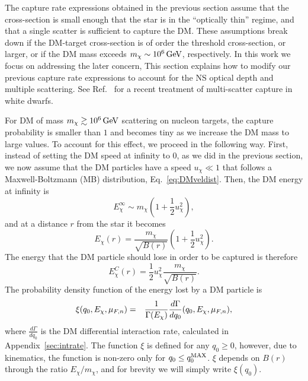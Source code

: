 The capture rate expressions obtained in the previous section assume that the cross-section is small enough that the star is in the ``optically thin'' regime, and that a single scatter is sufficient to capture the DM. These assumptions break down if the DM-target cross-section is of order the threshold cross-section, or larger, or if the DM mass exceeds $m_\chi \sim 10^6{\rm \,GeV}$, respectively. 
In this work we focus on addressing the later concern, 
This section explains how to modify our previous capture rate expressions to account for the NS optical depth and multiple scattering.  See Ref.~\cite{Dasgupta:2019juq_Darkmattercapture} for a recent treatment of multi-scatter capture in white dwarfs.


For DM of mass $m_\chi\gtrsim 10^6{\rm \,GeV}$ scattering on nucleon targets, the capture probability is smaller than $1$ and becomes tiny as we increase the DM mass to large values. To account for this effect, we proceed in the following way. First, instead of setting the DM speed at infinity to $0$, as we did in the previous section, we now assume that the DM particles have a speed $u_\chi\ll 1$ that follows a Maxwell-Boltzmann (MB) distribution, Eq.~\ref{eq:DMveldist}. 
Then, the DM energy at infinity is 
\begin{equation}
    E^\infty_\chi \sim m_\chi \left(1+\frac{1}{2}u_\chi^2\right), 
\end{equation}
and at a distance $r$ from the star it becomes
\begin{equation}
    E_\chi(r) = \frac{m_\chi}{\sqrt{B(r)}} \left(1+\frac{1}{2}u_\chi^2\right).
    \label{eq:Echir}
\end{equation}
The energy that the DM particle should lose in order to be captured is therefore
\begin{equation}
    E_\chi^C(r) =  \frac{1}{2}u_\chi^2 \frac{m_\chi}{\sqrt{B(r)}}. 
\end{equation} 
The probability density function of the energy lost by a DM particle is 
\begin{eqnarray}
\xi(q_0,E_\chi,\mu_{F,n}) &=& \frac{1}{\Gamma(E_\chi)}\frac{d\Gamma}{dq_0}(q_0,E_\chi,\mu_{F,n}),\label{eq:normintrate}
\end{eqnarray}
where $\frac{d\Gamma}{dq_0}$ is the DM differential interaction rate, calculated in Appendix~\ref{sec:intrate}. 
The function $\xi$ is defined for any $q_0\ge 0$, however, due to kinematics, the function is non-zero only for $q_0\le q_0^{\rm MAX}$. $\xi$ depends on $B(r)$ through the ratio $E_\chi/m_\chi$, and for brevity we will simply write $\xi(q_0)$.



